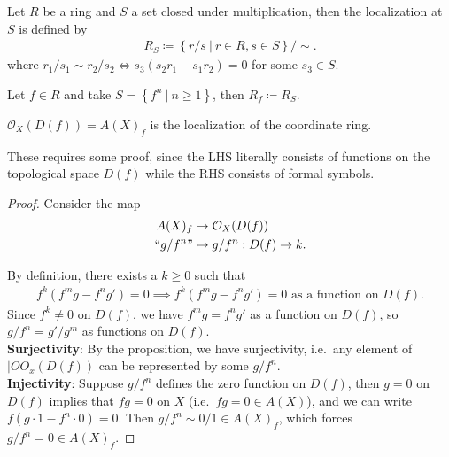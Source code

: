 \begin{definition}[Localization]

Let \(R\) be a ring and \(S\) a set closed under multiplication, then
the localization at \(S\) is defined by
\begin{align*}  
R_S \coloneqq\left\{{r/s {~\mathrel{\Big|}~}r\in R, s\in S}\right\} / \sim
.\end{align*}
where \(r_1/s_1 \sim r_2/s_2 \iff s_3(s_2 r_1 - s_1 r_2) = 0\) for some
\(s_3 \in S\).

\end{definition}

\begin{example}

Let \(f\in R\) and take
\(S = \left\{{f^n {~\mathrel{\Big|}~}n\geq 1}\right\}\), then
\(R_f \coloneqq R_S\).

\end{example}

\begin{corollary}[?]

\({\mathcal{O}}_X(D(f)) = A(X)_f\) is the localization of the coordinate
ring.

\end{corollary}

These requires some proof, since the LHS literally consists of functions
on the topological space \(D(f)\) while the RHS consists of formal
symbols.

\begin{proof}

Consider the map
\begin{align*}  
A(X)_f &\to {\mathcal{O}}_X(D(f)) \\
``g/f^n" &\mapsto g/f^n: D(f) \to k
.\end{align*}

By definition, there exists a \(k\geq 0\) such that
\begin{align*}  
f^k(f^m g - f^n g') = 0 
\implies
f^k(f^m g - f^n g') = 0 \text{ as a function on } D(f)
.\end{align*}
Since \(f^k \neq 0\) on \(D(f)\), we have \(f^m g = f^n g'\) as a
function on \(D(f)\), so \(g/f^n = g'/g^m\) as functions on \(D(f)\).\\

\textbf{Surjectivity}: By the proposition, we have surjectivity,
i.e.~any element of \(|OO_x(D(f))\) can be represented by some
\(g/f^n\).\\

\textbf{Injectivity}: Suppose \(g/f^n\) defines the zero function on
\(D(f)\), then \(g = 0\) on \(D(f)\) implies that \(fg=0\) on \(X\)
(i.e.~\(fg= 0 \in A(X)\)), and we can write
\(f(g\cdot 1 - f^n\cdot 0) = 0\). Then \(g/f^n\sim 0/1 \in A(X)_f\),
which forces \(g/f^n = 0\in A(X)_f\).

\end{proof}

